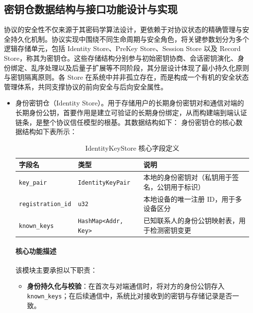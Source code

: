 \subsection{密钥仓数据结构与接口功能设计与实现}
协议的安全性不仅来源于其密码学算法设计，更依赖于对协议状态的精确管理与安全持久化机制。协议实现中围绕不同生命周期与安全角色，将关键参数划分为多个逻辑存储单元，包括 Identity Store、PreKey Store、Session Store 以及 Record Store，称其为密钥仓。这些存储结构分别参与初始密钥协商、会话密钥演化、身份绑定、乱序处理以及后量子扩展等不同阶段，其分层设计体现了最小持久化原则与密钥隔离原则。各 Store 在系统中并非孤立存在，而是构成一个有机的安全状态管理体系，共同支撑协议的前向安全与后向安全属性。
\begin{itemize}
    \item 身份密钥仓（Identity Store）。用于存储用户的长期身份密钥对和通信对端的长期身份公钥，首要作用是建立可验证的长期身份绑定，从而构建端到端认证链条，是整个协议信任模型的根基。其数据结构如下：
    身份密钥仓的核心数据结构如下表所示：
    \begin{table}[htbp]
    \centering
    \caption{IdentityKeyStore 核心字段定义}
    \label{tab:identity_keystore_fields}
    \small %
    \begin{tabular}{@{}l l p{5.5cm}@{}}
    \toprule
    \textbf{字段名} & \textbf{类型} & \textbf{说明} \\
    \midrule
    \texttt{key\_pair} & \texttt{IdentityKeyPair} & 本地的身份密钥对（私钥用于签名，公钥用于标识） \\
    \texttt{registration\_id} & \texttt{u32} & 本地设备的唯一注册 ID，用于多设备区分 \\
    \texttt{known\_keys} & \texttt{HashMap<Addr, Key>} & 已知联系人的身份公钥映射表，用于检测密钥变更 \\
    \bottomrule
    \end{tabular}
    \end{table}
    
    \paragraph{核心功能描述}
    \label{subsec:keystore_functionality}

该模块主要承担以下职责：

\begin{itemize}
    \item \textbf{身份持久化与校验}：在首次与对端通信时，将对方的身份公钥存入 \texttt{known\_keys}；在后续通信中，系统比对接收到的密钥与存储记录是否一致。
    

\end{itemize}
\end{itemize}
